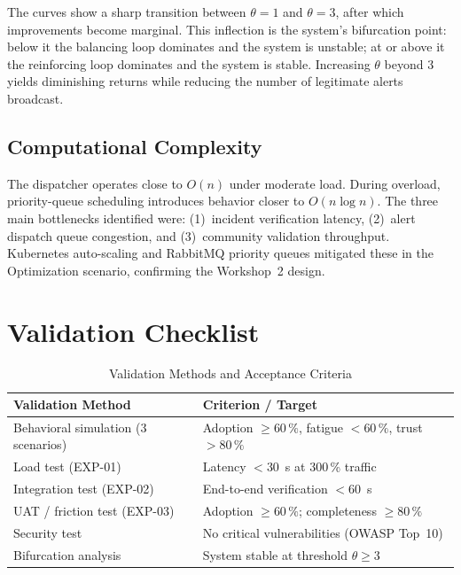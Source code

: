 \documentclass[conference,a4paper,10pt]{IEEEtran}
\begin{document}
The curves show a sharp transition between $\theta = 1$ and
$\theta = 3$, after which improvements become marginal. This
inflection is the system's bifurcation point: below it the
balancing loop dominates and the system is unstable; at or above
it the reinforcing loop dominates and the system is stable.
Increasing $\theta$ beyond 3 yields diminishing returns while
reducing the number of legitimate alerts broadcast.

\subsection{Computational Complexity}

The dispatcher operates close to $O(n)$ under moderate load.
During overload, priority-queue scheduling introduces behavior
closer to $O(n \log n)$. The three main bottlenecks identified
were: (1)~incident verification latency, (2)~alert dispatch queue
congestion, and (3)~community validation throughput. Kubernetes
auto-scaling and RabbitMQ priority queues mitigated these in the
Optimization scenario, confirming the Workshop~2 design.

\section{Validation Checklist}

\begin{table}[H]
\caption{Validation Methods and Acceptance Criteria}
\label{tab:validation}\centering\small
\begin{tabular}{p{3.5cm}p{3.9cm}}
\toprule
\textbf{Validation Method} & \textbf{Criterion / Target}\\
\midrule
Behavioral simulation (3 scenarios) &
  Adoption $\geq 60\,\%$, fatigue $< 60\,\%$, trust $> 80\,\%$\\
Load test (EXP-01) &
  Latency $< 30$~s at 300\,\% traffic\\
Integration test (EXP-02) &
  End-to-end verification $< 60$~s\\
UAT / friction test (EXP-03) &
  Adoption $\geq 60\,\%$; completeness $\geq 80\,\%$\\
Security test &
  No critical vulnerabilities (OWASP Top~10)\\
Bifurcation analysis &
  System stable at threshold $\theta \geq 3$\\
\bottomrule
\end{tabular}
\end{table}
\end{document}

